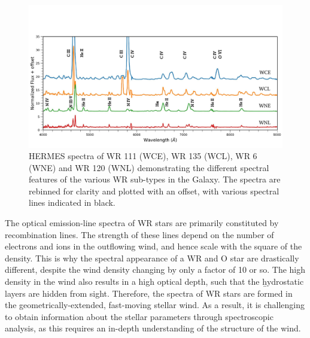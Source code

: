 \begin{figure}
    \centering
    \includegraphics[width=\textwidth]{chapters/introduction/image/Obs_SpT.pdf}
    \caption{HERMES spectra of WR 111 (WCE), WR 135 (WCL), WR 6 (WNE) and WR 120 (WNL) demonstrating the different spectral features of the various WR sub-types in the Galaxy. The spectra are rebinned for clarity and plotted with an offset, with various spectral lines indicated in black.}
    \label{fig:spectypes}
\end{figure}

The optical emission-line spectra of WR stars are primarily constituted by recombination lines. The strength of these lines depend on the number of electrons and ions in the outflowing wind, and hence scale with the square of the density. This is why the spectral appearance of a WR and O star are drastically different, despite the wind density changing by only a factor of 10 or so. The high density in the wind also results in a high optical depth, such that the \b{hydrostatic layers are} hidden from sight. Therefore, the spectra of WR stars are formed in the geometrically-extended, fast-moving stellar wind. As a result, it is challenging to obtain information about the stellar parameters through spectroscopic analysis, as this requires an in-depth understanding of the structure of the wind.

